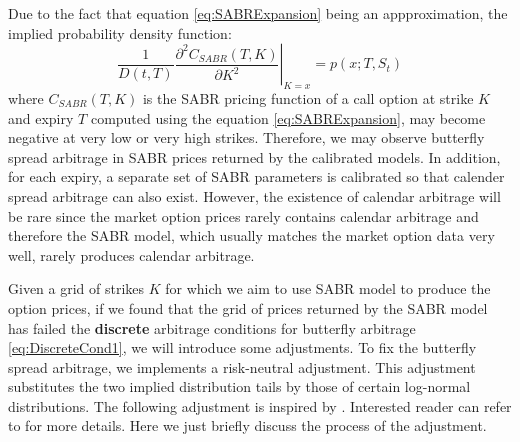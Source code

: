 \documentclass[letterpaper,12pt,titlepage,oneside,final]{book}
\numberwithin{equation}{section}
\theoremstyle{definition}
\begin{document}
Due to the fact that equation \eqref{eq:SABRExpansion} being an appproximation, the implied probability density function:
\begin{equation}
\frac{1}{D(t,T)} \left. \frac{\partial^2 C_{SABR}(T,K)}{\partial K^2} \right\vert_{K=x}=	p(x;T,S_t) 
\label{eq:impliedDensity}
\end{equation}
where $C_{SABR}(T,K)$ is the SABR pricing function of a call option at strike $K$ and expiry $T$ computed using the equation \eqref{eq:SABRExpansion}, may become negative at very low or very high strikes. Therefore, we may observe butterfly spread arbitrage in SABR prices returned by the calibrated models. In addition, for each expiry, a separate set of SABR parameters is calibrated so that calender spread arbitrage can also exist. However, the existence of calendar arbitrage will be rare since the market option prices rarely contains calendar arbitrage and therefore the SABR model, which usually matches the  market option data very well, rarely produces calendar arbitrage.


Given a grid of strikes $K$ for which we aim to use SABR model to produce the option prices, if we found that the grid of prices returned by the SABR model has failed the  \textbf{discrete} arbitrage conditions for butterfly arbitrage \eqref{eq:DiscreteCond1}, we will introduce some adjustments. To fix the butterfly spread  arbitrage, we implements a risk-neutral adjustment. This adjustment substitutes the two implied distribution tails by those of certain log-normal distributions. The following  adjustment is inspired by \cite{brunner2003arbitrage}. Interested reader can refer to \cite{brunner2003arbitrage} for more details. Here we just briefly discuss the process of the adjustment.
\end{document}
